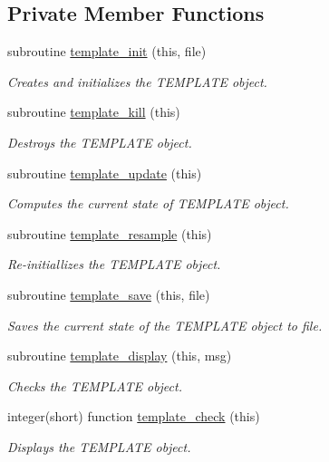 \subsection*{Private Member Functions}
\begin{DoxyCompactItemize}
\item 
subroutine \hyperlink{classtemplate__class_afada03bed94ed0e30fc64e11fdc5d129}{template\+\_\+init} (this, file)
\begin{DoxyCompactList}\small\item\em Creates and initializes the T\+E\+M\+P\+L\+A\+T\+E object. \end{DoxyCompactList}\item 
subroutine \hyperlink{classtemplate__class_a366839a54d53b1b42596fcb6979c49e3}{template\+\_\+kill} (this)
\begin{DoxyCompactList}\small\item\em Destroys the T\+E\+M\+P\+L\+A\+T\+E object. \end{DoxyCompactList}\item 
subroutine \hyperlink{classtemplate__class_ab9e51260f15fea473f62d16c07329252}{template\+\_\+update} (this)
\begin{DoxyCompactList}\small\item\em Computes the current state of T\+E\+M\+P\+L\+A\+T\+E object. \end{DoxyCompactList}\item 
subroutine \hyperlink{classtemplate__class_ad296ef0f288e19f326fd85ec615223cf}{template\+\_\+resample} (this)
\begin{DoxyCompactList}\small\item\em Re-\/initiallizes the T\+E\+M\+P\+L\+A\+T\+E object. \end{DoxyCompactList}\item 
subroutine \hyperlink{classtemplate__class_a35aadd43e518eec1e9fab596d018441c}{template\+\_\+save} (this, file)
\begin{DoxyCompactList}\small\item\em Saves the current state of the T\+E\+M\+P\+L\+A\+T\+E object to file. \end{DoxyCompactList}\item 
subroutine \hyperlink{classtemplate__class_abce4d2dbf856d00e563f5bb628c446cd}{template\+\_\+display} (this, msg)
\begin{DoxyCompactList}\small\item\em Checks the T\+E\+M\+P\+L\+A\+T\+E object. \end{DoxyCompactList}\item 
integer(short) function \hyperlink{classtemplate__class_a61fa7b21db4be16f8d32b67df5b9463c}{template\+\_\+check} (this)
\begin{DoxyCompactList}\small\item\em Displays the T\+E\+M\+P\+L\+A\+T\+E object. \end{DoxyCompactList}\end{DoxyCompactItemize}


